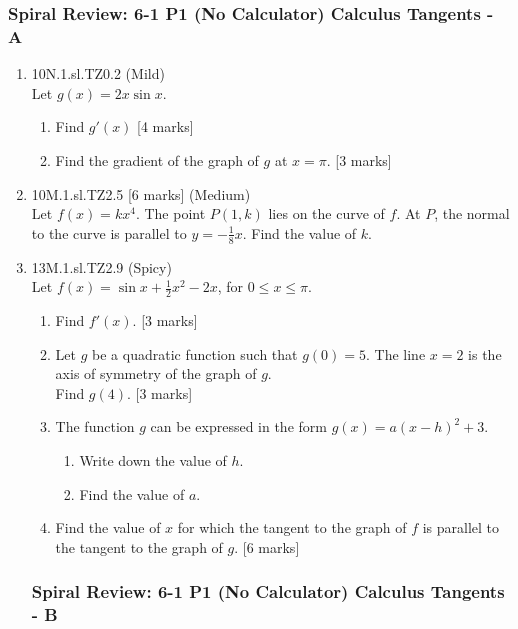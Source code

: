\documentclass[12pt, twoside]{article}
\begin{document}
\subsubsection*{Spiral Review: 6-1 P1 (No Calculator) Calculus Tangents - A}
 \begin{enumerate}

  \item 10N.1.sl.TZ0.2 (Mild)\\
  Let $g(x)=2x \sin x$.
  \begin{enumerate}
    \item Find $g'(x)$ [4 marks]
    \item Find the gradient of the graph of $g$ at $x=\pi$. [3 marks]
  \end{enumerate}

\vspace{2cm}
  \item 10M.1.sl.TZ2.5 [6 marks] (Medium)\\
  Let $f(x)=kx^4$. The point $P(1,k)$ lies on the curve of $f$. At $P$, the normal to the curve is parallel to $y=- \frac{1}{8} x$. Find the value of $k$.

\vspace{2cm}
  \item 13M.1.sl.TZ2.9 (Spicy)\\
  Let $f(x)=\sin x + \frac{1}{2} x^2 -2x$, for $0 \leq x \leq \pi$.\\
  \begin{enumerate}
    \item Find $f'(x)$. [3 marks]
    \item Let $g$ be a quadratic function such that $g(0)=5$. The line $x=2$ is the axis of symmetry of the graph of $g$.\\
    Find $g(4)$. [3 marks]
    \item The function $g$ can be expressed in the form $g(x)=a(x-h)^2+3$.
      \begin{enumerate}
        \item Write down the value of $h$.
        \item Find the value of $a$.
      \end{enumerate}
    \item Find the value of $x$ for which the tangent to the graph of $f$ is parallel to the tangent to the graph of $g$. [6 marks]
  \end{enumerate}

\newpage
\setcounter{enumi}{0}
\subsubsection*{Spiral Review: 6-1 P1 (No Calculator) Calculus Tangents - B}


\end{enumerate}
\end{document}
